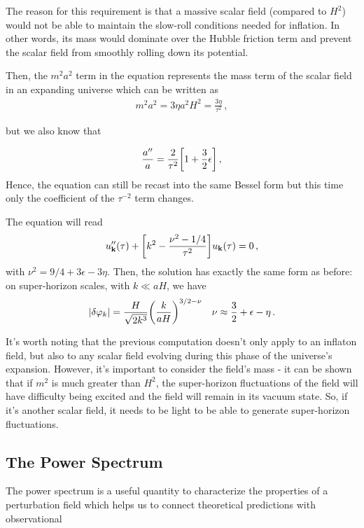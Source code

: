 The reason for this requirement is that a massive scalar field (compared to $H^2$) would not be able to maintain the slow-roll conditions needed for inflation. In other words, its mass would dominate over the Hubble friction term and prevent the scalar field from smoothly rolling down its potential.

 Then, the \(m^2 a^2\) term in the equation represents the mass term of the scalar field in an expanding universe which can be written as
\begin{align}
    m^2 a^2 = 3 \eta a^2 H^2 = \frac{3 \eta}{\tau^2}\label{2.104}
    \,,
\end{align}

but we also know that 

\begin{align}
    \frac{a''}{a} = \frac{2}{\tau^2 } \qty[ 1 + \frac{3}{2} \epsilon ]
    \,, \label{2.105}
\end{align}
%
Hence, the equation can still be recast into the same Bessel form but this time only the coefficient of the \(\tau^{-2}\) term changes.

The equation will read 
%
\begin{align}
    u''_{\mathbf{k}} (\tau ) + \qty[ k^2 - \frac{\nu^2 - 1/4}{\tau^2}]  u_{\mathbf{k}}(\tau ) = 0
    \,,\label{2.106}
\end{align}
%
with \(\nu^2 = 9/4 + 3 \epsilon - 3 \eta\). 
Then, the solution has exactly the same form as before:\\
on super-horizon scales, with \(k \ll aH\), we have
%
\begin{align}
    \abs{ \delta \varphi _k} = \frac{H}{\sqrt{2 k^3}} \qty( \frac{k}{aH})^{3/2 - \nu }
    &&
    \nu \approx \frac{3}{2} + \epsilon - \eta
    \,.\label{2.107}
\end{align}

It's worth noting that the previous computation doesn't only apply to an inflaton field, but also to any scalar field evolving during this phase of the universe's expansion. However, it's important to consider the field's mass - it can be shown that if $m^2$ is much greater than $H^2$, the super-horizon fluctuations of the field will have difficulty being excited and the field will remain in its vacuum state. So, if it's another scalar field, it needs to be light to be able to generate super-horizon fluctuations.








\subsection{The Power Spectrum} \label{section 2.5}
The power spectrum is a useful quantity to characterize the properties of a perturbation field which helps us to connect theoretical predictions with observational

